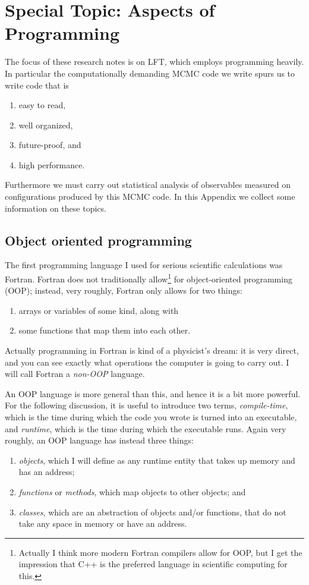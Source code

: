 \chapter{Special Topic: Aspects of Programming}\label{ap:oop}

The focus of these research notes is on LFT, which employs programming heavily.
In particular the computationally demanding MCMC code we write spurs us to
write code that is
\begin{enumerate}
  \item easy to read,
  \item well organized,
  \item future-proof, and
  \item high performance.
\end{enumerate}
Furthermore we must carry out statistical analysis of observables measured on
configurations produced by this MCMC code. In this Appendix we collect
some information on these topics.


\section{Object oriented programming}


The first programming language I used for serious scientific calculations
was Fortran. Fortran does not traditionally 
allow\footnote{Actually I think more modern Fortran compilers 
allow for OOP, but I get the impression that C++ is the preferred language
in scientific computing for this.} for object-oriented programming (OOP); 
instead, very roughly, Fortran only
allows for two things:
\begin{enumerate}
  \item arrays or variables of some kind, along with 
  \item some functions that map them into each other.
\end{enumerate}
Actually programming in Fortran is kind
of a physicist's dream: it is very direct, and you can see exactly what
operations the computer is going to carry out. I will call Fortran
a {\it non-OOP} language.

An OOP language is more general than this, and hence it is a bit more powerful.
For the following discussion, it is useful to introduce two terms,
{\it compile-time}, which is the time during which the code you wrote
is turned into an executable, and {\it runtime}, which is the time during
which the executable runs.
Again very roughly, an OOP language has instead three things:
\begin{enumerate}
  \item {\it objects}, which I will define as any runtime entity that 
        takes up memory and has an address;
  \item {\it functions} or {\it methods}, which map objects to other
        objects; and
  \item {\it classes}, which are an abstraction of objects and/or functions,
        that do not take any space in memory or have an address.
\end{enumerate}

